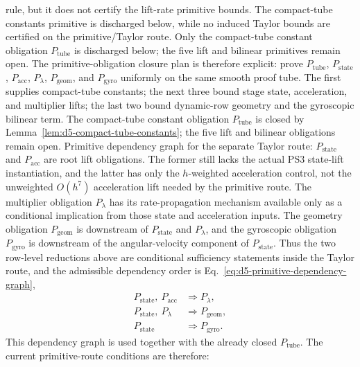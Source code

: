 \documentclass[preprint,12pt]{elsarticle}
\begin{document}
rule, but it does not certify the lift-rate primitive bounds.  The
compact-tube constants primitive is discharged below, while no induced Taylor bounds are
certified on the primitive/Taylor route.  Only the compact-tube constant
obligation \(P_{\mathrm{tube}}\) is discharged below; the five lift and
bilinear primitives remain open.
The primitive-obligation closure plan is therefore explicit: prove
\(P_{\mathrm{tube}}\), \(P_{\mathrm{state}}\), \(P_{\mathrm{acc}}\),
\(P_{\lambda}\), \(P_{\mathrm{geom}}\), and \(P_{\mathrm{gyro}}\) uniformly on
the same smooth proof tube.  The first supplies compact-tube constants; the
next three bound stage state, acceleration, and multiplier lifts; the last two
bound dynamic-row geometry and the gyroscopic bilinear term.  The compact-tube
constant obligation \(P_{\mathrm{tube}}\) is closed by
Lemma~\ref{lem:d5-compact-tube-constants}; the five lift and bilinear
obligations remain open.
Primitive dependency graph for the separate Taylor route: \(P_{\mathrm{state}}\)
and \(P_{\mathrm{acc}}\) are root lift obligations.  The former still lacks
the actual PS3 state-lift instantiation, and the latter has only the
\(h\)-weighted acceleration control, not the unweighted \(O(h^7)\)
acceleration lift needed by the primitive route.  The multiplier obligation
\(P_{\lambda}\) has its rate-propagation mechanism available only as a
conditional implication from those state and acceleration inputs.  The geometry obligation
\(P_{\mathrm{geom}}\) is downstream of \(P_{\mathrm{state}}\) and
\(P_{\lambda}\), and the gyroscopic obligation \(P_{\mathrm{gyro}}\) is
downstream of the angular-velocity component of \(P_{\mathrm{state}}\).
Thus the two row-level reductions above are conditional sufficiency statements inside
the Taylor route, and the admissible dependency order is
Eq.~\eqref{eq:d5-primitive-dependency-graph},
\begin{equation}
\label{eq:d5-primitive-dependency-graph}
\begin{aligned}
  P_{\mathrm{state}},\ P_{\mathrm{acc}}
  &\Longrightarrow P_{\lambda},\\
  P_{\mathrm{state}},\ P_{\lambda}
  &\Longrightarrow P_{\mathrm{geom}},\\
  P_{\mathrm{state}}
  &\Longrightarrow P_{\mathrm{gyro}} .
\end{aligned}
\end{equation}
This dependency graph is used together with the already closed
\(P_{\mathrm{tube}}\).
The current primitive-route conditions are therefore:
\end{document}
